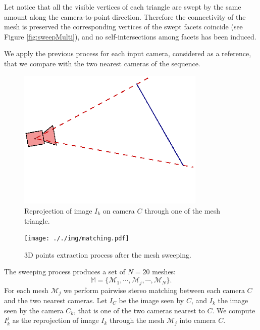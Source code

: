 Let notice that all the visible vertices of each triangle are swept by the same amount along the camera-to-point direction. 
Therefore the connectivity of the mesh is preserved \ie the corresponding vertices of the swept facets coincide (see Figure \ref{fig:sweepMulti}),  and no self-intersections among facets has been induced. 

We apply the previous process for each input camera, considered as a reference, that we compare with the two nearest cameras of the sequence.



\begin{figure}[t]
\centering
\includegraphics[width=0.8\textwidth]{./img/sweepSteps-01}
\caption{Reprojection of image $I_k$ on camera $C$ through one of the mesh triangle.}
\label{fig:stereo}
\end{figure}

\begin{figure}[t]
  \centering
  \texttt{[image: ././img/matching.pdf]}
\caption{3D points extraction process after the mesh sweeping.}
  \label{fig:matching}
\end{figure}


The sweeping process produces a set of $N = 20$ meshes:
\[
    \mathbb{M} = \{\mathcal{M}_1, \cdots, \mathcal{M}_j ,\cdots, \mathcal{M}_N\}.
\]
For each mesh $\mathcal{M}_j$ we perform pairwise stereo matching between each camera $C$ and the two nearest cameras.
Let $I_C$ be the image seen by $C$, and $I_k$ the image seen by the camera $C_k$, that is one of the two cameras nearest to $C$. 
We compute $I_k^j$ as the reprojection of image $I_k$ through the mesh $\mathcal{M}_j$ into camera $C$.


